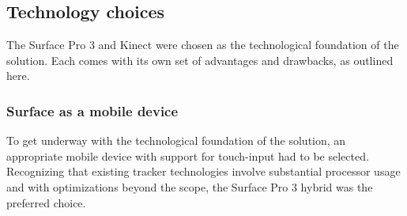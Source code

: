 \subsection{Technology choices}

The Surface Pro 3 and Kinect were chosen as the technological foundation of the solution. Each comes with its own set of advantages and drawbacks, as outlined here. 

\subsubsection{Surface as a mobile device}

To get underway with the technological foundation of the solution, an appropriate mobile device with support for touch-input had to be selected. Recognizing that existing tracker technologies involve substantial processor  usage and with optimizations beyond the scope, the Surface Pro 3 hybrid was the preferred choice. 


%

%
%



%

